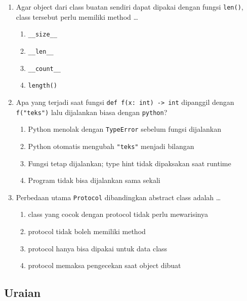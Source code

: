 \begin{enumerate}
  \item Agar object dari class buatan sendiri dapat dipakai dengan fungsi \texttt{len()}, class tersebut perlu memiliki method \ldots
  \begin{enumerate}[label=\alph*.,itemsep=0pt]
    \item \texttt{\_\_size\_\_}
    \item \texttt{\_\_len\_\_}
    \item \texttt{\_\_count\_\_}
    \item \texttt{length()}
  \end{enumerate}

  \item Apa yang terjadi saat fungsi \texttt{def f(x: int) -> int} dipanggil dengan \texttt{f("teks")} lalu dijalankan biasa dengan \texttt{python}?
  \begin{enumerate}[label=\alph*.,itemsep=0pt]
    \item Python menolak dengan \texttt{TypeError} sebelum fungsi dijalankan
    \item Python otomatis mengubah \texttt{"teks"} menjadi bilangan
    \item Fungsi tetap dijalankan; type hint tidak dipaksakan saat runtime
    \item Program tidak bisa dijalankan sama sekali
  \end{enumerate}

  \item Perbedaan utama \texttt{Protocol} dibandingkan abstract class adalah \ldots
  \begin{enumerate}[label=\alph*.,itemsep=0pt]
    \item class yang cocok dengan protocol tidak perlu mewarisinya
    \item protocol tidak boleh memiliki method
    \item protocol hanya bisa dipakai untuk data class
    \item protocol memaksa pengecekan saat object dibuat
  \end{enumerate}
\end{enumerate}

\subsection{Uraian}


